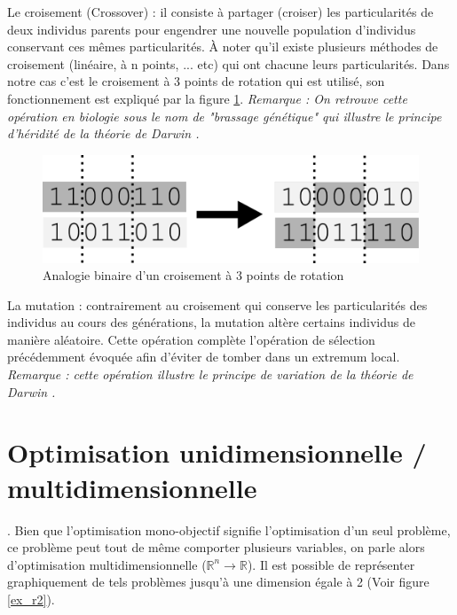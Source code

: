 \documentclass[12pt]{report}
\begin{document}
        Le croisement (Crossover) :
          il consiste à partager (croiser) les particularités de deux individus parents pour engendrer une nouvelle population d'individus conservant ces mêmes particularités. À noter qu'il existe plusieurs méthodes de croisement (linéaire, à n points, ... etc) qui ont chacune leurs particularités. Dans notre cas c'est le croisement à 3 points de rotation qui est utilisé, son fonctionnement est expliqué par la figure \ref{sch_crossover}.
          \emph{Remarque : On retrouve cette opération en biologie sous le nom de "brassage génétique" qui illustre le principe d'héridité de la théorie de Darwin \cite{darwin}.}
          \begin{figure}[h]
            \centering
            \includegraphics{img/crossover.png}
            \caption{Analogie binaire d'un croisement à 3 points de rotation}
            \label{sch_crossover}
          \end{figure}

        La mutation \cite{wiki6} :
          contrairement au croisement qui conserve les particularités des individus au cours des générations, la mutation altère certains individus de manière aléatoire. Cette opération complète l'opération de sélection précédemment évoquée afin d'éviter de tomber dans un extremum local.
          \emph{Remarque : cette opération illustre le principe de variation de la théorie de Darwin \cite{darwin}.}

    \section{Optimisation unidimensionnelle / multidimensionnelle}.
      Bien que l'optimisation mono-objectif signifie l'optimisation d'un seul problème, ce problème peut tout de même comporter plusieurs variables, on parle alors d'optimisation multidimensionnelle ($\mathbb{R}^n \rightarrow \mathbb{R}$). Il est possible de représenter graphiquement de tels problèmes jusqu'à une dimension égale à 2 (Voir figure \ref{ex_r2}).
\end{document}
